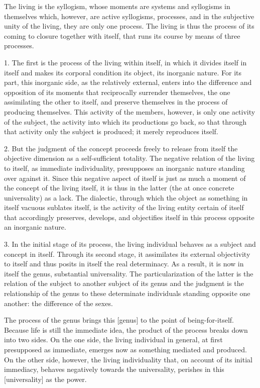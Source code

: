 The living is the syllogism, whose moments are systems and syllogisms
in themselves which, however, are active syllogisms, processes, and
in the subjective unity of the living, they are only one process.
The living is thus the process of its coming to closure together with itself,
that runs its course by means of three processes.

1. The first is the process of the living within itself,
in which it divides itself in itself and makes its
corporal condition its object, its inorganic nature.
For its part, this inorganic side, as the relatively external,
enters into the difference and opposition of its moments that reciprocally
surrender themselves, the one assimilating the other to itself, and
preserve themselves in the process of producing themselves.
This activity of the members, however, is only one activity of
the subject, the activity into which its productions go back,
so that through that activity only the subject is produced;
it merely reproduces itself.

2. But the judgment of the concept proceeds freely to release from itself
the objective dimension as a self-sufficient totality.
The negative relation of the living to itself, as immediate individuality,
presupposes an inorganic nature standing over against it.
Since this negative aspect of itself is just as much a moment of
the concept of the living itself, it is thus in the latter
(the at once concrete universality) as a lack.
The dialectic, through which the object as something in itself vacuous sublates itself,
is the activity of the living entity certain of itself that accordingly
preserves, develops, and objectifies itself in this process opposite an inorganic nature.

3. In the initial stage of its process,
the living individual behaves as
a subject and concept in itself.
Through its second stage, it assimilates
its external objectivity to itself
and thus posits in itself the real determinacy.
As a result, it is now in itself the genus,
substantial universality.
The particularization of the latter is
the relation of the subject to another subject of its genus
and the judgment is the relationship of the genus to
these determinate individuals standing opposite one another:
the difference of the sexes.

The process of the genus brings this [genus] to
the point of being-for-itself.
Because life is still the immediate idea,
the product of the process breaks down into two sides.
On the one side, the living individual in general,
at first presupposed as immediate,
emerges now as something mediated and produced.
On the other side, however, the living individuality that,
on account of its initial immediacy,
behaves negatively towards the universality,
perishes in this [universality] as the power.


